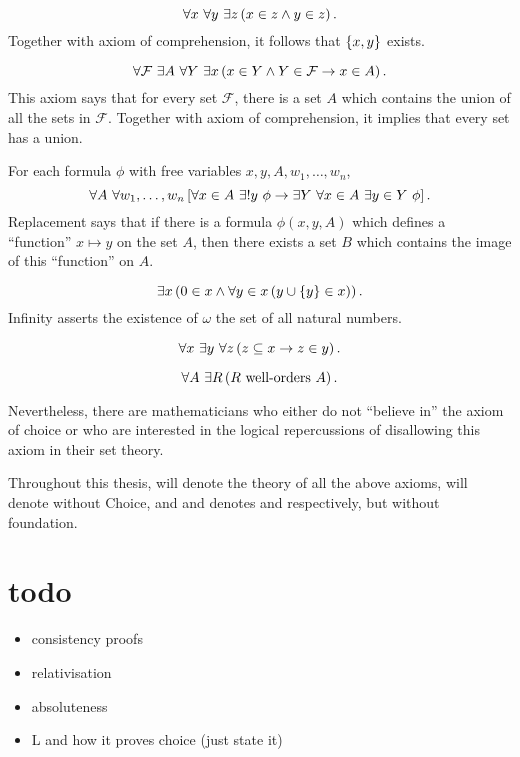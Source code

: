 \begin{axiom}[Pairing]
    \[\forall x\ \forall y\ \exists z\left(x\in z\land y\in z\right).\]
    Together with axiom of comprehension, it follows that \({\left\{ x,y \right\}}\) exists.
\end{axiom}

\begin{axiom}[Union]
    \[\forall\mathcal{F}\ \exists A\ \forall Y\ \exists x\left(x\in Y\land Y\in\mathcal{F}\to x\in A\right). \]
    This axiom says that for every set \(\mathcal{F}\), there is a set \(A\) which contains the union of all the sets in \(\mathcal{F}\).
    Together with axiom of comprehension, it implies that every set has a union.
\end{axiom}

\begin{axiom}
    For each formula \(\phi\) with free variables \(x,y,A,w_1,\dots,w_n\), \[ \forall A\ \forall w_1,\dots,w_n \sq{\forall x\in A\ \exists! y\ \phi \to \exists Y\ \forall x\in A\ \exists y\in Y\ \phi} .\]
    Replacement says that if there is a formula \(\phi(x,y,A)\) which defines a ``function'' \(x\mapsto y\) on the set \(A\),
    then there exists a set \(B\) which contains the image of this ``function'' on \(A\).
\end{axiom}

\begin{axiom}[Infinity]
    \[\exists x\left(0\in x\land \forall y\in x\left(y\cup{\left\{ y \right\}} \in x\right)\right). \]
    Infinity asserts the existence of \(\omega\) the set of all natural numbers.
\end{axiom}

\begin{axiom}
    \[\forall x\ \exists y\ \forall z\left(z\subseteq x\to z\in y\right).\]
\end{axiom}

\begin{axiom}[Choice]
    \[ \forall A\ \exists R \left(R \text{ well-orders } A\right). \]
\end{axiom}

Nevertheless, there are mathematicians who either do not ``believe in'' the axiom of choice or who are interested in the logical repercussions of disallowing this axiom in their set theory.

Throughout this thesis, \ZFC will denote the theory of all the above axioms, \ZF will denote \ZFC without Choice,
and \ZFCminus and \ZFminus denotes \ZFC and \ZF respectively, but without foundation.

\section{todo}

\begin{itemize}
    \item consistency proofs
    \item relativisation
    \item absoluteness
    \item L and how it proves choice (just state it)
\end{itemize}
